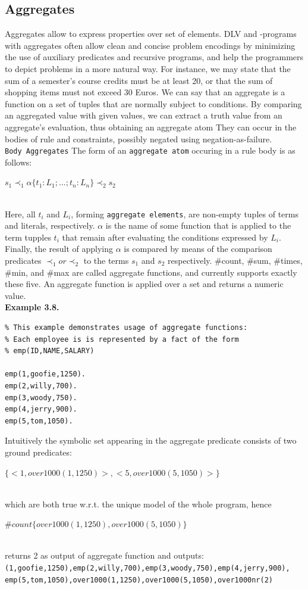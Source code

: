 \documentclass[14pt,a4paper, titlepage]{article}
\begin{document}
\subsection{Aggregates}
Aggregates allow to express properties over set of elements. DLV and \hex{}-programs with aggregates often allow clean and concise problem encodings by minimizing the use of auxiliary predicates and recursive programs, and help the programmers to depict problems in a more natural way. For instance, we may state that the sum of a semester's course credits must be at least 20, or that the sum of shopping items must not exceed 30 Euros. We can say that an aggregate is a function on a set of tuples that are normally subject to conditions. By comparing an aggregated value with given values, we can extract a truth value from an aggregate's evaluation, thus obtaining an aggregate atom 
They can occur in the bodies of rule and constraints, possibly negated using negation-as-failure. \\ \texttt{Body Aggregates} The form of an \texttt{aggregate atom} occuring in a rule body is as follows:\\ \centerline{$s_1 \prec_1 \alpha \{ t_1:L_1;...;t_n:L_n\} \prec_2 s_2$} 
\\ Here, all \texttt{$t_i$} and \texttt{$L_i$}, forming \texttt{aggregate elements}, are non-empty tuples of terms and literals, respectively. $\alpha$ is the name of some function that is applied to the term tupples \texttt{$t_i$} that remain after evaluating the conditions expressed by $L_i$. Finally,  the result of applying $\alpha$ is compared by means of the comparison predicates $\prec_1 or \prec_2$ to the terms $s_1$ and $s_2$ respectively. \#count, \#sum, \#times, \#min, and \#max are called aggregate functions, and \dlvhex{} currently supports exactly these five. An aggregate function is applied over a set and returns a numeric value.
\\ \textbf{Example 3.8.}
\begin{lstlisting}
% This example demonstrates usage of aggregate functions:
% Each employee is is represented by a fact of the form 
% emp(ID,NAME,SALARY)

emp(1,goofie,1250).
emp(2,willy,700).
emp(3,woody,750).
emp(4,jerry,900).
emp(5,tom,1050).
\end{lstlisting}
Intuitively the symbolic set appearing in the aggregate predicate consists of two ground predicates: \\ \centerline{$\{<1,over1000(1,1250)>,<5,over1000(5,1050)>\}$}
\\which are both true w.r.t. the unique model of the whole program, hence \\ \centerline{$ \#count\{over1000(1,1250),over1000(5,1050)\}$} \\returns 2 as output of aggregate function and outputs:\\ \texttt{(1,goofie,1250),emp(2,willy,700),emp(3,woody,750),emp(4,jerry,900),\\emp(5,tom,1050),over1000(1,1250),over1000(5,1050),over1000nr(2)}
\end{document}
